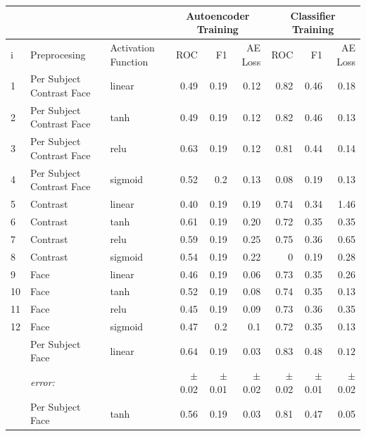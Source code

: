      \begin{table}[!h] {\small
        \centering
      \begin{tabular}{lllrrrrrr}
            && &   \multicolumn{3}{|c|}{Autoencoder Training} &  \multicolumn{3}{c|}{Classifier Training}    \\
        \hline
         i&Preprocesing    & Activation Function&  ROC&F1&AE Loss & ROC & F1 & AE Loss \\
         \hline
         1&Per Subject Contrast Face & linear &    0.49 &   0.19 &     0.12 &    0.82 &   0.46 &     0.18 \\
         2&Per Subject Contrast Face & tanh   &    0.49 &   0.19 &     0.12 &    0.82 &   0.46 &     0.13 \\
         3&Per Subject Contrast Face & relu   &    0.63 &   0.19 &     0.12 &    0.81 &   0.44 &     0.14 \\
         4& Per Subject Contrast Face & sigmoid &    0.52 &   0.2  &     0.13 &    0.08 &   0.19 &     0.13 \\
         5&Contrast          & linear &    0.40 &   0.19 &     0.19 &    0.74 &   0.34 &     1.46 \\
         6&Contrast          & tanh   &    0.61 &   0.19 &     0.20 &    0.72 &   0.35 &     0.35 \\
         7&Contrast          & relu   &    0.59 &   0.19 &     0.25 &    0.75 &   0.36 &     0.65 \\
         8& Contrast         & sigmoid &    0.54 &   0.19 &     0.22 &    0    &   0.19 &     0.28 \\
         9&Face              & linear &    0.46 &   0.19 &     0.06 &    0.73 &   0.35 &     0.26 \\
         10&Face              & tanh   &    0.52 &   0.19 &     0.08 &    0.74 &   0.35 &     0.13 \\
         11&Face              & relu   &    0.45 &   0.19 &     0.09 &    0.73 &   0.36 &     0.35 \\
         12& Face             & sigmoid &    0.47 &   0.2  &     0.1  &    0.72 &   0.35 &     0.13 \\
         \hdashline
         13&Per Subject Face  & linear &    $0.64$ &   $0.19$ &     $0.03$ &    $0.83$ &   $0.48$ &     $0.12$ \\
         &{\it error:}  &&$\pm$0.02 &$\pm$0.01 &$\pm$0.02  &$\pm$0.02 &$\pm$0.01 &$\pm$0.02 \\
         \hdashline
         14&Per Subject Face  & tanh   &    0.56 &   0.19 &     0.03 &    0.81 &   0.47 &     0.05 \\

\end{tabular}}
\end{table}
